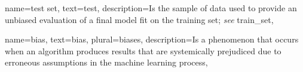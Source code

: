 {
    name={test set},
    text={test},
    description={Is the sample of data used to provide an unbiased evaluation of a final model fit on the training set; \emph{see} \gls{train_set}},
}

{
    name={bias},
    text={bias},
    plural={biases},
    description={Is a phenomenon that occurs when an algorithm produces results that are systemically prejudiced due to erroneous assumptions in the machine learning process},
}



